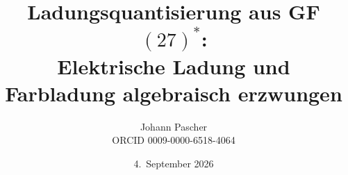 \documentclass[11pt,a4paper]{report}
\title{Ladungsquantisierung aus GF$(27)^*$:\\[0.5em]
  \large Elektrische Ladung und Farbladung algebraisch erzwungen}
\date{4.~September 2026}
\author{Johann Pascher\\\small ORCID 0009-0000-6518-4064}
\begin{document}
\renewcommand{\thechapter}{}
\renewcommand{\thesection}{\arabic{section}}
\maketitle
\tableofcontents

\end{document}

